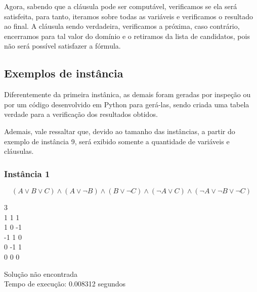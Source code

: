 \documentclass[12pt]{article}
\begin{document}
    \par Agora, sabendo que a cláusula pode ser computável, verificamos se ela será satisfeita, para tanto, iteramos sobre todas as variáveis e verificamos o resultado ao final. A cláusula sendo verdadeira, verificamos a próxima, caso contrário, encerramos para tal valor do domínio e o retiramos da lista de candidatos, pois não será possível satisfazer a fórmula. 

    \subsection{Exemplos de instância}
    \par Diferentemente da primeira instânica, as demais foram geradas por inspeção ou por um código desenvolvido em Python para gerá-las, sendo criada uma tabela verdade para a verificação dos resultados obtidos.
    \par Ademais, vale ressaltar que, devido ao tamanho das instâncias, a partir do exemplo de instância 9, será exibido somente a quantidade de variáveis e cláusulas.
    \subsubsection{Instância 1}
        \[(A \lor B \lor C) \land (A \lor \neg B) \land (B \lor \neg C) \land (\neg A \lor C) \land (\neg A \lor \neg B \lor \neg C)\]
        \begin{tcolorbox}[title=Entrada da instância 1, width=\linewidth, 
          fontupper=\ttfamily, 
          halign=flush left]
            3 \\ 
            1 1 1 \\
            1 0 -1 \\
            -1 1 0 \\
            0 -1 1 \\
            0 0 0 \\
        \end{tcolorbox}
        
        \begin{tcolorbox}[title=Saída da instância 1, width=\linewidth, fontupper=\ttfamily, halign=flush left]
            Solução não encontrada \\
            Tempo de execução: 0.008312 segundos 
        \end{tcolorbox}
\end{document}
